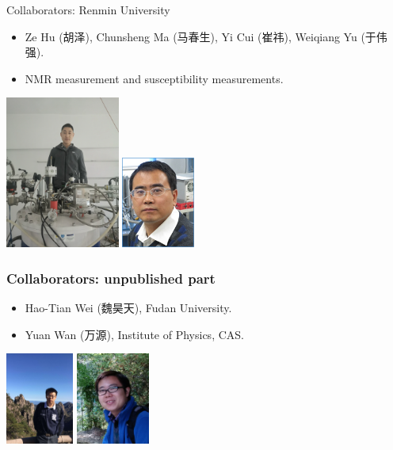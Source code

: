 \documentclass[xcolor=table, aspectratio=1610,ignorenonframetext]{beamer}
\begin{document}
\begin{frame}{Collaborators: Renmin University}
  \begin{itemize}
  \item Ze Hu (胡泽), Chunsheng Ma (马春生), Yi Cui (崔祎), Weiqiang Yu (于伟强).
  \item NMR measurement and susceptibility measurements.
  \end{itemize}
  \begin{center}
    \includegraphics[height=5cm]{../people/zehu_large}
    \includegraphics[height=3cm]{../people/weiqiangyu}
  \end{center}
\end{frame}

\begin{frame}
  \frametitle{Collaborators: unpublished part}
  \begin{itemize}
  \item Hao-Tian Wei (魏昊天), Fudan University.
  \item Yuan Wan (万源), Institute of Physics, CAS.
  \end{itemize}
  \begin{center}
    \includegraphics[height=3cm]{../people/haotianwei}
    \includegraphics[height=3cm]{../people/yuanwan}
  \end{center}
\end{frame}
\end{document}
